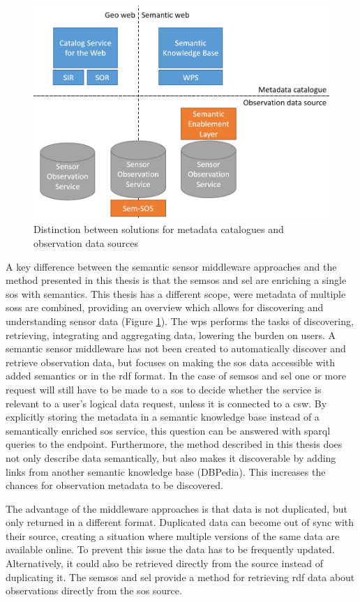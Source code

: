 \begin{figure}
	\centering
	\includegraphics[width=0.8\linewidth]{figs/catalogVSsource2.PNG}
	\caption{Distinction between solutions for metadata catalogues and observation data sources}
	\label{fig:catVSsource}
\end{figure}

A key difference between the semantic sensor middleware approaches and the method presented in this thesis is that the \ac{semsos} and \ac{sel} are enriching a single \ac{sos} with semantics. This thesis has a different scope, were metadata of multiple \aclp{sos} are combined, providing an overview which allows for discovering and understanding sensor data (Figure \ref{fig:catVSsource}). The \ac{wps} performs the tasks of discovering, retrieving, integrating and aggregating data, lowering the burden on users. A semantic sensor middleware has not been created to automatically discover and retrieve observation data, but focuses on making the \ac{sos} data accessible with added semantics or in the \ac{rdf} format. In the case of \ac{semsos} and \ac{sel} one or more request will still have to be made to a \ac{sos} to decide whether the service is relevant to a user's logical data request, unless it is connected to a \ac{csw}. By explicitly storing the metadata in a semantic knowledge base instead of a semantically enriched \ac{sos} service, this question can be answered with \ac{sparql} queries to the endpoint. Furthermore, the method described in this thesis does not only describe data semantically, but also makes it discoverable by adding links from another semantic knowledge base (DBPedia). This increases the chances for observation metadata to be discovered.        

The advantage of the middleware approaches is that data is not duplicated, but only returned in a different format. Duplicated data can become out of sync with their source, creating a situation where multiple versions of the same data are available online. To prevent this issue the data has to be frequently updated. Alternatively, it could also be retrieved directly from the source instead of duplicating it. The \ac{semsos} and \ac{sel} provide a method for retrieving \ac{rdf} data about observations directly from the \ac{sos} source.

